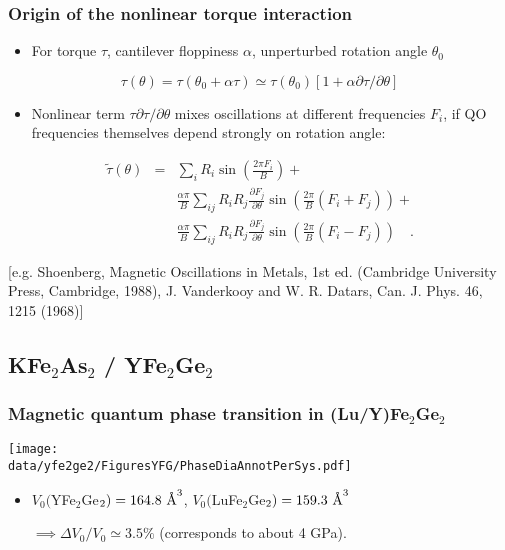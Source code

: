 \begin{frame}[label=TorqueInteraction]
\frametitle{Origin of the nonlinear torque interaction}

\begin{itemize}
\item For torque $\tau$, cantilever floppiness $\alpha$, unperturbed rotation angle $\theta_0$
\end{itemize}
\[
\tau(\theta)=\tau(\theta_0+\alpha\tau) \simeq \tau(\theta_0)[1+\alpha \partial \tau/\partial\theta]
\]

\begin{itemize}
\item 
Nonlinear term $\tau \partial \tau/\partial\theta$ mixes oscillations at different frequencies $F_i$, if QO frequencies themselves depend strongly on rotation angle:
\end{itemize}
\begin{eqnarray*}
    \tilde\tau(\theta)&=&\sum_i R_i \sin\left(\frac{2\pi F_i}{B}\right) + \nonumber \\
    && \frac{\alpha\pi}{B}\sum_{ij} R_i R_j \frac{\partial F_j}{\partial \theta}\sin\left(\frac{2\pi}{B}(F_i+F_j)\right) + \nonumber \\
    && \frac{\alpha\pi}{B}\sum_{ij} R_i R_j \frac{\partial F_j}{\partial \theta}\sin\left(\frac{2\pi}{B}(F_i-F_j)\right) \quad .
\end{eqnarray*}

\vspace*{\fill}
\centerline{\makebox[\linewidth]{\rule{0.85\textwidth}{0.4pt}}}
\begin{center}
{\scriptsize[e.g. Shoenberg, Magnetic Oscillations in Metals, 1st ed. (Cambridge University Press, Cambridge, 1988), J. Vanderkooy and W. R. Datars, Can. J. Phys. 46, 1215 (1968)]}
\end{center}


\end{frame}


\subsection{KFe$_2$As$_2$ / YFe$_2$Ge$_2$}
\begin{frame}[label=YFGIntro2b]
\frametitle{Magnetic quantum phase transition in (Lu/Y)Fe$_2$Ge$_2$}
\centerline{\texttt{[image: \\data/yfe2ge2/FiguresYFG/PhaseDiaAnnotPerSys.pdf]}}
\begin{itemize}
\item
$V_0 ($YFe$_2$Ge$_2) = 164.8 ~\mbox{\AA}^3$, $V_0 ($LuFe$_2$Ge$_2) =
159.3 ~\mbox{\AA}^3$ 

\hfill $\implies \Delta V_0/V_0 \simeq 3.5 \%$
(corresponds to about 4 GPa).
\end{itemize}
\end{frame}



